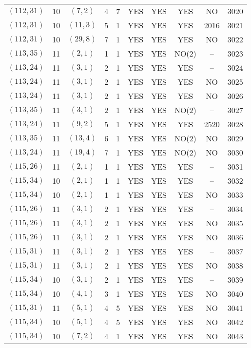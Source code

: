 \begin{longtable}{|c|c|c|c|c|c|c|c|c|c|}
$(112, 31)$ & 10 & $(7, 2)$ & 4 & 7 & YES & YES & YES & NO & 3020\\
$(112, 31)$ & 10 & $(11, 3)$ & 5 & 1 & YES & YES & YES & 2016 & 3021\\
$(112, 31)$ & 10 & $(29, 8)$ & 7 & 1 & YES & YES & YES & NO & 3022\\
$(113, 35)$ & 11 & $(2, 1)$ & 1 & 1 & YES & YES & NO(2) & -- & 3023\\
$(113, 24)$ & 11 & $(3, 1)$ & 2 & 1 & YES & YES & YES & -- & 3024\\
$(113, 24)$ & 11 & $(3, 1)$ & 2 & 1 & YES & YES & YES & NO & 3025\\
$(113, 24)$ & 11 & $(3, 1)$ & 2 & 1 & YES & YES & YES & NO & 3026\\
$(113, 35)$ & 11 & $(3, 1)$ & 2 & 1 & YES & YES & NO(2) & -- & 3027\\
$(113, 24)$ & 11 & $(9, 2)$ & 5 & 1 & YES & YES & YES & 2520 & 3028\\
$(113, 35)$ & 11 & $(13, 4)$ & 6 & 1 & YES & YES & NO(2) & NO & 3029\\
$(113, 24)$ & 11 & $(19, 4)$ & 7 & 1 & YES & YES & NO(2) & NO & 3030\\
$(115, 26)$ & 11 & $(2, 1)$ & 1 & 1 & YES & YES & YES & -- & 3031\\
$(115, 34)$ & 10 & $(2, 1)$ & 1 & 1 & YES & YES & YES & -- & 3032\\
$(115, 34)$ & 10 & $(2, 1)$ & 1 & 1 & YES & YES & YES & NO & 3033\\
$(115, 26)$ & 11 & $(3, 1)$ & 2 & 1 & YES & YES & YES & -- & 3034\\
$(115, 26)$ & 11 & $(3, 1)$ & 2 & 1 & YES & YES & YES & NO & 3035\\
$(115, 26)$ & 11 & $(3, 1)$ & 2 & 1 & YES & YES & YES & NO & 3036\\
$(115, 31)$ & 11 & $(3, 1)$ & 2 & 1 & YES & YES & YES & -- & 3037\\
$(115, 31)$ & 11 & $(3, 1)$ & 2 & 1 & YES & YES & YES & NO & 3038\\
$(115, 34)$ & 10 & $(3, 1)$ & 2 & 1 & YES & YES & YES & -- & 3039\\
$(115, 34)$ & 10 & $(4, 1)$ & 3 & 1 & YES & YES & YES & NO & 3040\\
$(115, 31)$ & 11 & $(5, 1)$ & 4 & 5 & YES & YES & YES & NO & 3041\\
$(115, 34)$ & 10 & $(5, 1)$ & 4 & 5 & YES & YES & YES & NO & 3042\\
$(115, 34)$ & 10 & $(7, 2)$ & 4 & 1 & YES & YES & YES & NO & 3043\\

\end{longtable}
